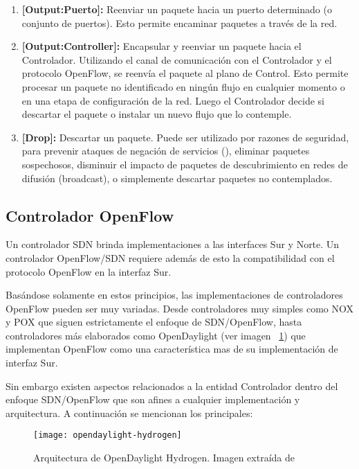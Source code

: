 \begin{enumerate}
\item \textbf{[Output:Puerto]:} Reenviar un paquete hacia un puerto determinado (o conjunto de puertos). Esto permite encaminar paquetes a través de la red.

\item \textbf{[Output:Controller]:} Encapsular y reenviar un paquete hacia el Controlador. Utilizando el canal de comunicación con el Controlador y el protocolo OpenFlow, se reenvía el paquete al plano de Control. Esto permite procesar un paquete no identificado en ningún flujo en cualquier momento o en una etapa de configuración de la red. Luego el Controlador decide si descartar el paquete o instalar un nuevo flujo que lo contemple.

\item \textbf{[Drop]:} Descartar un paquete. Puede ser utilizado por razones de seguridad, para prevenir ataques de negación de servicios (), eliminar paquetes sospechosos, disminuir el impacto de paquetes de descubrimiento en redes de difusión (broadcast), o simplemente descartar paquetes no contemplados.
\end{enumerate}

\subsection{Controlador OpenFlow}
Un controlador SDN brinda implementaciones a las interfaces Sur y Norte. Un controlador OpenFlow/SDN requiere adem\'as de esto la compatibilidad con el protocolo OpenFlow en la interfaz Sur. 

Basándose solamente en estos principios, las implementaciones de controladores OpenFlow pueden ser muy variadas. Desde controladores muy simples como NOX\cite{ControllersNOX} y POX\cite{ControllersPOX} que siguen estrictamente el enfoque de SDN/OpenFlow, hasta controladores m\'as elaborados como OpenDaylight\cite{ControllersOpendaylight} (ver imagen ~\ref{fig:OpenDayLightHydrogen}) que implementan OpenFlow como una característica mas de su implementaci\'on de interfaz Sur.

Sin embargo existen aspectos relacionados a la entidad Controlador dentro del enfoque SDN/OpenFlow que son afines a cualquier implementaci\'on y arquitectura. A continuaci\'on se mencionan los principales:
  
\begin{figure}[h!] 
\centering    
\texttt{[image: opendaylight-hydrogen]}
\caption[Arquitectura de OpenDaylight Hydrogen]{Arquitectura de OpenDaylight Hydrogen. Imagen extraída de \cite{OpenDaylightArch}}
\label{fig:OpenDayLightHydrogen}
\end{figure}

